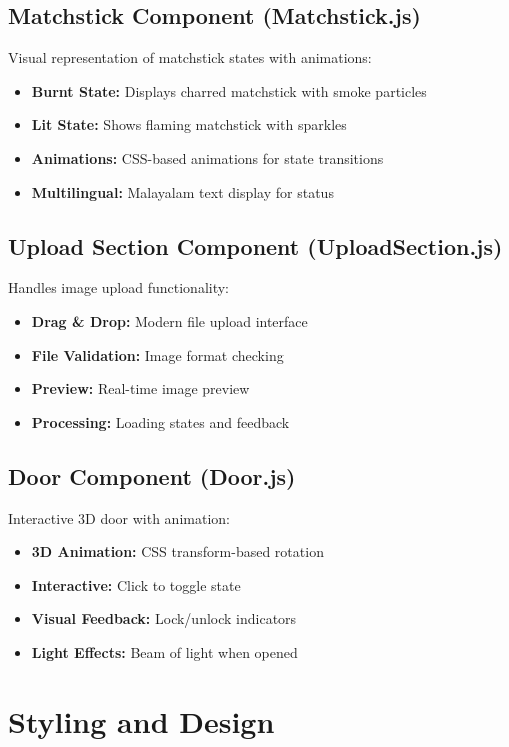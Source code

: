 \documentclass[12pt,a4paper]{article}
\begin{document}
\subsection{Matchstick Component (Matchstick.js)}
Visual representation of matchstick states with animations:

\begin{itemize}
    \item \textbf{Burnt State:} Displays charred matchstick with smoke particles
    \item \textbf{Lit State:} Shows flaming matchstick with sparkles
    \item \textbf{Animations:} CSS-based animations for state transitions
    \item \textbf{Multilingual:} Malayalam text display for status
\end{itemize}

\subsection{Upload Section Component (UploadSection.js)}
Handles image upload functionality:

\begin{itemize}
    \item \textbf{Drag \& Drop:} Modern file upload interface
    \item \textbf{File Validation:} Image format checking
    \item \textbf{Preview:} Real-time image preview
    \item \textbf{Processing:} Loading states and feedback
\end{itemize}

\subsection{Door Component (Door.js)}
Interactive 3D door with animation:

\begin{itemize}
    \item \textbf{3D Animation:} CSS transform-based rotation
    \item \textbf{Interactive:} Click to toggle state
    \item \textbf{Visual Feedback:} Lock/unlock indicators
    \item \textbf{Light Effects:} Beam of light when opened
\end{itemize}

\section{Styling and Design}
\end{document}
